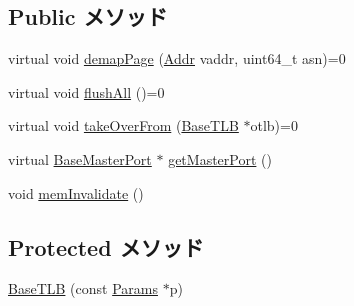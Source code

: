 \subsection*{Public メソッド}
\begin{DoxyCompactItemize}
\item 
virtual void \hyperlink{classBaseTLB_aff4b9d01b9a4712c699cfb2dd9b3b8cd}{demapPage} (\hyperlink{base_2types_8hh_af1bb03d6a4ee096394a6749f0a169232}{Addr} vaddr, uint64\_\-t asn)=0
\item 
virtual void \hyperlink{classBaseTLB_a5958bc92949a47d1be1088468abdc006}{flushAll} ()=0
\item 
virtual void \hyperlink{classBaseTLB_abb09460e26e2667f44dad5f0679835e5}{takeOverFrom} (\hyperlink{classBaseTLB}{BaseTLB} $\ast$otlb)=0
\item 
virtual \hyperlink{classBaseMasterPort}{BaseMasterPort} $\ast$ \hyperlink{classBaseTLB_a5125451589673cb85c7cab06c2ac5434}{getMasterPort} ()
\item 
void \hyperlink{classBaseTLB_afea64b0aa579c17485db54c6a5c2ede3}{memInvalidate} ()
\end{DoxyCompactItemize}
\subsection*{Protected メソッド}
\begin{DoxyCompactItemize}
\item 
\hyperlink{classBaseTLB_ac8e9bca1fe09b54b17069200cac8c9d3}{BaseTLB} (const \hyperlink{classSimObject_a0f0761d2db586a23bb2a2880b8f387bb}{Params} $\ast$p)
\end{DoxyCompactItemize}


